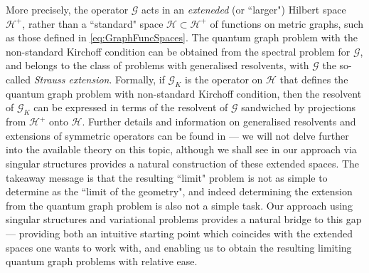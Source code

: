 More precisely, the operator $\mathcal{G}$ acts in an \emph{exteneded} (or ``larger") Hilbert space $\mathcal{H}^+$, rather than a ``standard" space $\mathcal{H}\subset\mathcal{H}^+$ of functions on metric graphs, such as those defined in \eqref{eq:GraphFuncSpaces}.
The quantum graph problem with the non-standard Kirchoff condition can be obtained from the spectral problem for $\mathcal{G}$, and belongs to the class of problems with generalised resolvents, with $\mathcal{G}$ the so-called \emph{Strauss extension}.
Formally, if $\mathcal{G}_K$ is the operator on $\mathcal{H}$ that defines the quantum graph problem with non-standard Kirchoff condition, then the resolvent of $\mathcal{G}_K$ can be expressed in terms of the resolvent of $\mathcal{G}$ sandwiched by projections from $\mathcal{H}^+$ onto $\mathcal{H}$.
Further details and information on generalised resolvents and extensions of symmetric operators can be found in \cite{strauss1999function} --- we will not delve further into the available theory on this topic, although we shall see in  our approach via singular structures provides a natural construction of these extended spaces.
The takeaway message is that the resulting ``limit" problem is not as simple to determine as the ``limit of the geometry", and indeed determining the extension from the quantum graph problem is also not a simple task.
Our approach using singular structures and variational problems provides a natural bridge to this gap --- providing both an intuitive starting point which coincides with the extended spaces one wants to work with, and enabling us to obtain the resulting limiting quantum graph problems with relative ease.

